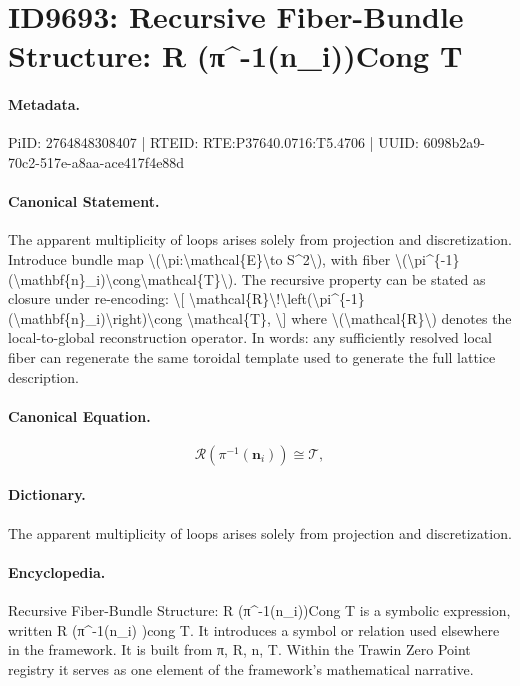 \section*{ID9693: Recursive Fiber-Bundle Structure: R (π\textasciicircum{}-1(n\_i))Cong T}
\paragraph{Metadata.}
PiID: 2764848308407 | RTEID: RTE:P37640.0716:T5.4706 | UUID: 6098b2a9-70c2-517e-a8aa-ace417f4e88d

\paragraph{Canonical Statement.}
The apparent multiplicity of loops arises solely from projection and discretization. Introduce bundle map \textbackslash{}(\textbackslash{}pi:\textbackslash{}mathcal\{E\}\textbackslash{}to S\textasciicircum{}2\textbackslash{}), with fiber \textbackslash{}(\textbackslash{}pi\textasciicircum{}\{-1\}(\textbackslash{}mathbf\{n\}\_i)\textbackslash{}cong\textbackslash{}mathcal\{T\}\textbackslash{}). The recursive property can be stated as closure under re-encoding: \textbackslash{}[ \textbackslash{}mathcal\{R\}\textbackslash{}!\textbackslash{}left(\textbackslash{}pi\textasciicircum{}\{-1\}(\textbackslash{}mathbf\{n\}\_i)\textbackslash{}right)\textbackslash{}cong \textbackslash{}mathcal\{T\}, \textbackslash{}] where \textbackslash{}(\textbackslash{}mathcal\{R\}\textbackslash{}) denotes the local-to-global reconstruction operator. In words: any sufficiently resolved local fiber can regenerate the same toroidal template used to generate the full lattice description.

\paragraph{Canonical Equation.}
\[
\mathcal{R}\!\left(\pi^{-1}(\mathbf{n}_i)\right)\cong \mathcal{T},
\]

\paragraph{Dictionary.}
The apparent multiplicity of loops arises solely from projection and discretization.

\paragraph{Encyclopedia.}
Recursive Fiber-Bundle Structure: R (π\textasciicircum{}-1(n\_i))Cong T is a symbolic expression, written R (π\textasciicircum{}-1(n\_i) )cong T. It introduces a symbol or relation used elsewhere in the framework. It is built from π, R, n, T. Within the Trawin Zero Point registry it serves as one element of the framework's mathematical narrative.
